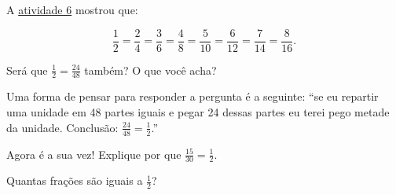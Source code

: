 \begin{refletindo*}[breakable]{}{}
  A \hyperref[chap4-ativ6]{atividade 6} mostrou que: 
  
  \[\frac{1}{2} = \frac{2}{4} = \frac{3}{6} = \frac{4}{8} = \frac{5}{10} = \frac{6}{12} = \frac{7}{14} = \frac{8}{16}.\]
  
  Será que $\frac{1}{2} = \frac{24}{48}$ também? O que você acha? 
  
  Uma forma de pensar para responder a pergunta é a seguinte: ``se eu repartir uma unidade em 48 partes iguais e pegar 24 dessas partes eu terei pego metade da unidade. Conclusão: $\frac{24}{48} = \frac{1}{2}$.'' 
  
  Agora é a sua vez! Explique por que $\frac{15}{30} = \frac{1}{2}$. 

  Quantas frações são iguais a $\frac{1}{2}$?
\end{refletindo*}


